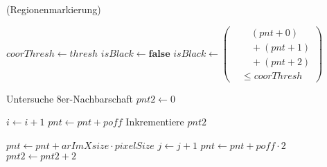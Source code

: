 \begin{algorithm}[!ht]\small
\caption{ (Regionenmarkierung)}
\label{alg:arlabeling-regionlabeling}
\begin{algorithmic}[1]
	\label{alg:arlabeling-regionlabeling-loop1-start}

		\label{alg:arlabeling-regionlabeling-loop2-start}

			\State $\mathit{coorThresh} \gets \mathit{thresh}$
			\label{alg:arlabeling-regionlabeling-threshold-start}
			\State $\mathit{isBlack} \gets \textbf{false}$
			\State $\mathit{isBlack} \gets \left(
			\begin{aligned}
				& \quad (\mathit{pnt} + 0) \\
				& \quad + (\mathit{pnt} + 1) \\
				& \quad + (\mathit{pnt} + 2) \\
				& \leq \mathit{coorThresh}
			\end{aligned}\right)$
			\label{alg:arlabeling-regionlabeling-calcblack}

			\label{alg:arlabeling-regionlabeling-isblack?}
				\State Untersuche 8er-Nachbarschaft
				\label{alg:arlabeling-regionlabeling-black}
			\Else
				\State $\mathit{pnt2} \gets 0$
				\label{alg:arlabeling-regionlabeling-notblack}
			\EndIf
			\label{alg:arlabeling-regionlabeling-threshold-end}

			\State $i \gets i + 1$
			\label{alg:arlabeling-regionlabeling-inc1-start}
			\State $\mathit{pnt} \gets \mathit{pnt} + \mathit{poff}$
			\State Inkrementiere $\mathit{pnt2}$
			\label{alg:arlabeling-regionlabeling-inc1-end}
		\EndFor
		\label{alg:arlabeling-regionlabeling-loop2-end}

		\State $\mathit{pnt} \gets \mathit{pnt} + \mathit{arImXsize} \cdot \mathit{pixelSize}$
		\label{alg:arlabeling-regionlabeling-inc2-start}
		\State $j \gets j + 1$
		\State $\mathit{pnt} \gets \mathit{pnt} + \mathit{poff} \cdot 2$
		\State $\mathit{pnt2} \gets \mathit{pnt2} + 2$
		\label{alg:arlabeling-regionlabeling-inc2-end}
	\EndFor
	\label{alg:arlabeling-regionlabeling-loop1-end}
\end{algorithmic}
\end{algorithm}